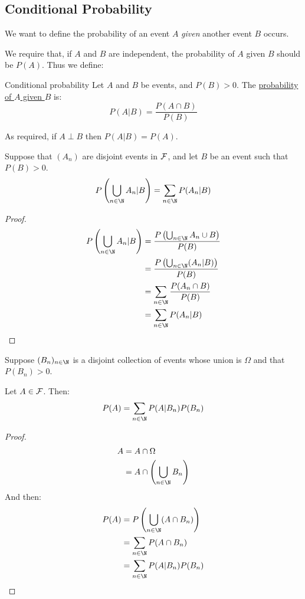 \documentclass[../Main.tex]{subfiles}
\begin{document}
\subsection{Conditional Probability}
We want to define the probability of an event $A$ \textit{given} another event $B$ occurs.\par
We require that, if $A$ and $B$ are independent, the probability of $A$ given $B$ should be $P(A)$. Thus we define:
\begin{definition}{Conditional probability}
    Let $A$ and $B$ be events, and $P(B) > 0$. The \underline{probability of $A$ given $B$} is:
    \begin{equation*}
        P(A | B) = \frac{P(A \cap B)}{P(B)}
    \end{equation*}
\end{definition}
\begin{remark}
    As required, if $A \perp B$ then $P(A | B) = P(A)$.
\end{remark}
\begin{proposition}
    Suppose that $(A_n)$ are disjoint events in $\mathcal{F}$, and let $B$ be an event such that $P(B) > 0$.
    \begin{equation*}
        P\left(\bigcup_{n \in \N} A_n | B\right) = \sum_{n \in \N} P(A_n | B)
    \end{equation*}
    \label{propConditionalDisjointProb}
\end{proposition}
\begin{proof}
    \begin{align*}
        P\left(\bigcup_{n \in \N} A_n | B\right) &= \frac{P\left(\bigcup_{n \in \N} A_n \cup B\right)}{P(B)} \\
        &= \frac{P\left(\bigcup_{n \in \N} (A_n | B)\right)}{P(B)} \\
        &= \sum_{n \in \N} \frac{P(A_n \cap B)}{P(B)} \\
        &= \sum_{n \in \N} P(A_n | B)
    \end{align*}
\end{proof}
\begin{theorem}
    Suppose $(B_n)_{n \in \N}$ is a disjoint collection of events whose union is $\Omega$ and that $P(B_n) > 0$.\par
    Let $A \in \mathcal{F}$. Then:
    \begin{equation*}
        P(A) = \sum_{n \in \N} P(A | B_n) P(B_n)
    \end{equation*}
    \label{thmTotalProbability}
\end{theorem}
\begin{proof}
    \begin{align*}
        A &= A \cap \Omega \\
        &= A \cap \left(\bigcup_{n \in \N}B_n\right)
    \end{align*}
    And then:
    \begin{align*}
        P(A) &= P\left(\bigcup_{n \in \N} (A \cap B_n) \right) \\
        &= \sum_{n \in \N}P(A \cap B_n) \\
        &= \sum_{n \in \N} P(A | B_n) P(B_n)
    \end{align*}
\end{proof}
\end{document}

